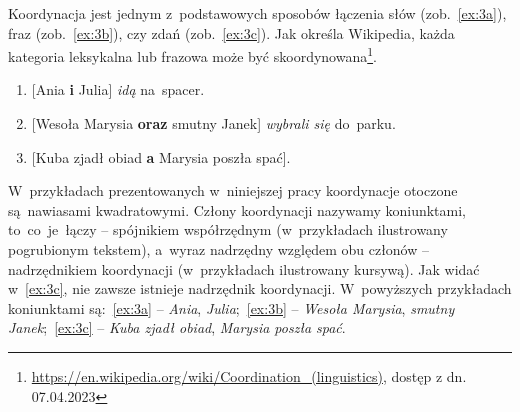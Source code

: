 \documentclass[licencjacka]{pracamgr_Kogni}
\begin{document}
    Koordynacja jest jednym z~podstawowych sposobów łączenia słów (zob.~\ref{ex:3a}), fraz (zob.~\ref{ex:3b}), czy zdań (zob.~\ref{ex:3c}). Jak określa Wikipedia, każda kategoria leksykalna lub frazowa może być skoordynowana\footnote{\url{https://en.wikipedia.org/wiki/Coordination_(linguistics)}, dostęp z dn. 07.04.2023}.
    \begin{exe}
        \ex
        \begin{enumerate}[label=\alph{enumi}., ref=(3\alph{enumi})]
            \item {[Ania \textbf{i} Julia] \textit{idą} na~spacer.}
            \label {ex:3a}
            \item {[Wesoła Marysia \textbf{oraz} smutny Janek] \textit{wybrali się} do~parku.}
            \label {ex:3b}
            \item {[Kuba zjadł obiad \textbf{a} Marysia poszła spać].}
            \label {ex:3c}
        \end{enumerate}
        \label{ex:3}
    \end{exe}
    W~przykładach prezentowanych w~niniejszej pracy koordynacje otoczone są~nawiasami kwadratowymi.
    Człony koordynacji nazywamy koniunktami, to~co~je~łączy -- spójnikiem współrzędnym (w~przykładach ilustrowany pogrubionym tekstem), a~wyraz nadrzędny względem obu członów -- nadrzędnikiem koordynacji (w~przykładach ilustrowany kursywą).
    Jak widać w~\ref{ex:3c}, nie zawsze istnieje nadrzędnik koordynacji.
    W~powyższych przykładach koniunktami są:~\ref{ex:3a} -- \textit{Ania}, \textit{Julia};~\ref{ex:3b} -- \textit{Wesoła Marysia}, \textit{smutny Janek};~\ref{ex:3c} -- \textit{Kuba zjadł obiad}, \textit{Marysia poszła spać}.
\end{document}
